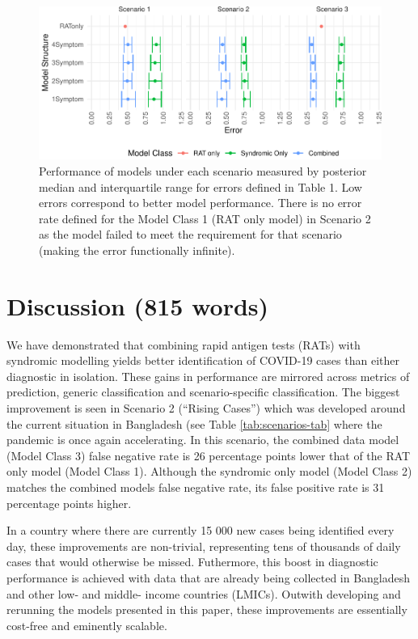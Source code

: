 \documentclass[]{elsarticle} %
\begin{document}
\begin{figure}
\centering
\includegraphics{0501_MainText_files/figure-latex/scenario-plot-1.pdf}
\caption{\label{fig:scenario-plot}Performance of models under each scenario measured by posterior median and interquartile range for errors defined in Table 1. Low errors correspond to better model performance. There is no error rate defined for the Model Class 1 (RAT only model) in Scenario 2 as the model failed to meet the requirement for that scenario (making the error functionally infinite).}
\end{figure}

\hypertarget{discussion-815-words}{%
\section{Discussion (815 words)}\label{discussion-815-words}}

We have demonstrated that combining rapid antigen tests (RATs) with syndromic modelling yields better identification of COVID-19 cases than either diagnostic in isolation.
These gains in performance are mirrored across metrics of prediction, generic classification and scenario-specific classification.
The biggest improvement is seen in Scenario 2 (``Rising Cases'') which was developed around the current situation in Bangladesh (see Table \ref{tab:scenarios-tab} where the pandemic is once again accelerating.
In this scenario, the combined data model (Model Class 3) false negative rate is
26 percentage points lower that of the RAT only model (Model Class 1).
Although the syndromic only model (Model Class 2) matches the combined models false negative rate, its false positive rate is
31 percentage points higher.

In a country where there are currently 15 000 new cases being identified every day, these improvements are non-trivial, representing tens of thousands of daily cases that would otherwise be missed.
Futhermore, this boost in diagnostic performance is achieved with data that are already being collected in Bangladesh and other low- and middle- income countries (LMICs).
Outwith developing and rerunning the models presented in this paper, these improvements are essentially cost-free and eminently scalable.
\end{document}
